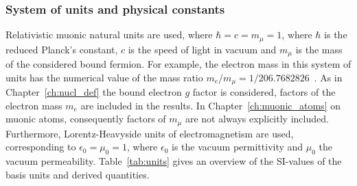 \subsubsection*{System of units and physical constants}
Relativistic muonic natural units are used, where $\hbar=c=m_\mu=1$, where $\hbar$ is the reduced Planck's constant, $c$ is the speed of light in vacuum and $m_\mu$ is the mass of the considered bound fermion. For example, the electron mass in this system of units has the numerical value of the mass ratio $m_e/m_\mu = 1/206.768 2826$~\cite{codata2016}. As in Chapter~\ref{ch:nucl_def} the bound electron $g$ factor is considered, factors of the electron mass $m_e$ are included in the results. In Chapter~\ref{ch:muonic_atoms} on muonic atoms, consequently factors of $m_\mu$ are not always explicitly included. 
Furthermore, Lorentz-Heavyside units of electromagnetism are used, corresponding to $\epsilon_0=\mu_0=1$, where $\epsilon_0$ is the vacuum permittivity and $\mu_0$ the vacuum permeability.
Table~\ref{tab:units} gives an overview of the SI-values of the basis units and derived quantities.\\[1.5cm]


